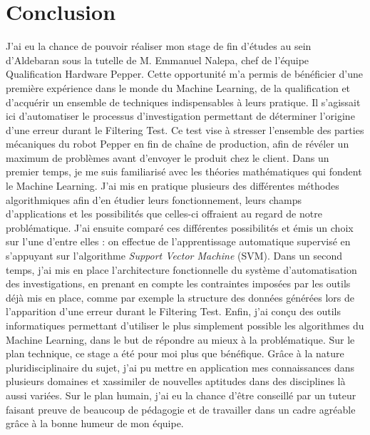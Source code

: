 \chapter{Conclusion}
\label{Conclusion}
\thispagestyle{fancy}

J'ai eu la chance de pouvoir réaliser mon stage de fin d'études au sein d'Aldebaran sous la tutelle de M. Emmanuel Nalepa, chef de l'équipe Qualification Hardware Pepper. Cette opportunité m'a permis de bénéficier d'une première expérience dans le monde du Machine Learning, de la qualification et d'acquérir un ensemble de techniques indispensables à leurs pratique. Il s'agissait ici d'automatiser le processus d'investigation permettant de déterminer l'origine d'une erreur durant le Filtering Test. Ce test vise à stresser l'ensemble des parties mécaniques du robot Pepper en fin de chaîne de production, afin de révéler un maximum de problèmes avant d'envoyer le produit chez le client.
\newline
\newline
Dans un premier temps, je me suis familiarisé avec les théories mathématiques qui fondent le Machine Learning. J'ai mis en pratique plusieurs des différentes méthodes algorithmiques afin d'en étudier leurs fonctionnement, leurs champs d'applications et les possibilités que celles-ci offraient au regard de notre problématique. J'ai ensuite comparé ces différentes possibilités et émis un choix sur l'une d'entre elles : on effectue de l'apprentissage automatique supervisé en s'appuyant sur l'algorithme \emph{Support Vector Machine} (SVM).
\newline
Dans un second temps, j'ai mis en place l'architecture fonctionnelle du système d'automatisation des investigations, en prenant en compte les contraintes imposées par les outils déjà mis en place, comme par exemple la structure des données générées lors de l'apparition d'une erreur durant le Filtering Test. 
\newline
Enfin, j'ai conçu des outils informatiques permettant d'utiliser le plus simplement possible les algorithmes du Machine Learning, dans le but de répondre au mieux à la problématique. 
\newline
\newline
Sur le plan technique, ce stage a été pour moi plus que bénéfique. Grâce à la nature pluridisciplinaire du sujet, j'ai pu mettre en application mes connaissances dans plusieurs domaines et xassimiler de nouvelles aptitudes dans des disciplines là aussi variées. Sur le plan humain, j'ai eu la chance d’être conseillé par un tuteur faisant preuve de beaucoup de pédagogie et de travailler dans un cadre agréable grâce à la bonne humeur de mon équipe.